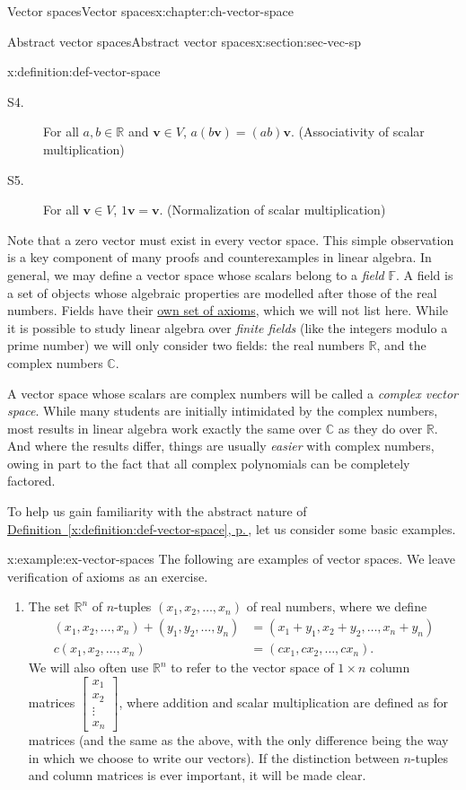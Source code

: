 \documentclass[oneside,10pt,]{book}
\newcommand{\xreffont}{\relax}
\numberwithin{equation}{section}
\newcommand{\bbm}{\begin{bmatrix}}
\newcommand{\ebm}{\end{bmatrix}}
\newcommand{\R}{\mathbb{R}}
\renewcommand{\C}{\mathbb{C}}
\newcommand{\vv}{\mathbf{v}}
\newcommand{\amp}{&}
\begin{document}
\begin{chapterptx}{Vector spaces}{}{Vector spaces}{}{}{x:chapter:ch-vector-space}
\begin{sectionptx}{Abstract vector spaces}{}{Abstract vector spaces}{}{}{x:section:sec-vec-sp}
\begin{definition}{}{x:definition:def-vector-space}
\begin{description}
\item[{S4.}]For all \(a,b\in \R\) and \(\vv\in V\), \(a(b\vv)=(ab)\vv\). (Associativity of scalar multiplication)%
\item[{S5.}]For all \(\vv\in V\), \(1\vv=\vv\). (Normalization of scalar multiplication)%
\end{description}
%
\end{definition}
Note that a zero vector must exist in every vector space. This simple observation is a key component of many proofs and counterexamples in linear algebra. In general, we may define a vector space whose scalars belong to a \emph{field} \(\mathbb{F}\). A field is a set of objects whose algebraic properties are modelled after those of the real numbers. Fields have their \href{https://en.wikipedia.org/wiki/Field_(mathematics)\#Classic_definition}{own set of axioms}, which we will not list here. While it is possible to study linear algebra over \emph{finite fields} (like the integers modulo a prime number) we will only consider two fields: the real numbers \(\R\), and the complex numbers \(\C\).%
\par
A vector space whose scalars are complex numbers will be called a \emph{complex vector space}. While many students are initially intimidated by the complex numbers, most results in linear algebra work exactly the same over \(\C\) as they do over \(\R\). And where the results differ, things are usually \emph{easier} with complex numbers, owing in part to the fact that all complex polynomials can be completely factored.%
\par
To help us gain familiarity with the abstract nature of \hyperref[x:definition:def-vector-space]{Definition~{\xreffont\ref{x:definition:def-vector-space}}, p.\,\pageref{x:definition:def-vector-space}}, let us consider some basic examples.%
\begin{example}{}{x:example:ex-vector-spaces}%
The following are examples of vector spaces. We leave verification of axioms as an exercise.%
\begin{enumerate}
\item{}The set \(\R^n\) of \(n\)-tuples \((x_1,x_2,\ldots, x_n)\) of real numbers, where we define%
\begin{align*}
(x_1,x_2,\ldots, x_n)+(y_1,y_2,\ldots, y_n) \amp = (x_1+y_1,x_2+y_2,\ldots, x_n+y_n) \\
c(x_1,x_2,\ldots, x_n)\amp = (cx_1,cx_2,\ldots, cx_n)\text{.}
\end{align*}
We will also often use \(\R^n\) to refer to the vector space of \(1\times n\) column matrices \(\bbm x_1\\x_2\\\vdots\\x_n\ebm\), where addition and scalar multiplication are defined as for matrices (and the same as the above, with the only difference being the way in which we choose to write our vectors). If the distinction between \(n\)-tuples and column matrices is ever important, it will be made clear.%

\end{enumerate}
\end{example}
\end{sectionptx}
\end{chapterptx}
\end{document}
